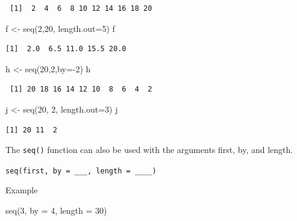 \documentclass[
  letterpaper,
  DIV=11,
  numbers=noendperiod]{scrreprt}
\newenvironment{Shaded}{\begin{snugshade}}{\end{snugshade}}
\newcommand{\AttributeTok}[1]{\textcolor[rgb]{0.40,0.45,0.13}{#1}}
\newcommand{\DecValTok}[1]{\textcolor[rgb]{0.68,0.00,0.00}{#1}}
\newcommand{\FunctionTok}[1]{\textcolor[rgb]{0.28,0.35,0.67}{#1}}
\newcommand{\NormalTok}[1]{\textcolor[rgb]{0.00,0.23,0.31}{#1}}
\newcommand{\OtherTok}[1]{\textcolor[rgb]{0.00,0.23,0.31}{#1}}
\newcommand{\SpecialCharTok}[1]{\textcolor[rgb]{0.37,0.37,0.37}{#1}}
\begin{document}
\begin{verbatim}
 [1]  2  4  6  8 10 12 14 16 18 20
\end{verbatim}

\begin{Shaded}
\begin{Highlighting}[]
\NormalTok{f }\OtherTok{\textless{}{-}} \FunctionTok{seq}\NormalTok{(}\DecValTok{2}\NormalTok{,}\DecValTok{20}\NormalTok{, }\AttributeTok{length.out=}\DecValTok{5}\NormalTok{)}
\NormalTok{f}
\end{Highlighting}
\end{Shaded}

\begin{verbatim}
[1]  2.0  6.5 11.0 15.5 20.0
\end{verbatim}

\begin{Shaded}
\begin{Highlighting}[]
\NormalTok{h }\OtherTok{\textless{}{-}} \FunctionTok{seq}\NormalTok{(}\DecValTok{20}\NormalTok{,}\DecValTok{2}\NormalTok{,}\AttributeTok{by=}\SpecialCharTok{{-}}\DecValTok{2}\NormalTok{)}
\NormalTok{h}
\end{Highlighting}
\end{Shaded}

\begin{verbatim}
 [1] 20 18 16 14 12 10  8  6  4  2
\end{verbatim}

\begin{Shaded}
\begin{Highlighting}[]
\NormalTok{j }\OtherTok{\textless{}{-}} \FunctionTok{seq}\NormalTok{(}\DecValTok{20}\NormalTok{, }\DecValTok{2}\NormalTok{, }\AttributeTok{length.out=}\DecValTok{3}\NormalTok{)}
\NormalTok{j}
\end{Highlighting}
\end{Shaded}

\begin{verbatim}
[1] 20 11  2
\end{verbatim}

The \texttt{seq()} function can also be used with the arguments first,
by, and length.

\texttt{seq(first,\ by\ =\ \_\_\_,\ length\ =\ \_\_\_\_)}

Example

\begin{Shaded}
\begin{Highlighting}[]
\FunctionTok{seq}\NormalTok{(}\DecValTok{3}\NormalTok{, }\AttributeTok{by =} \DecValTok{4}\NormalTok{, }\AttributeTok{length =} \DecValTok{30}\NormalTok{)}
\end{Highlighting}
\end{Shaded}
\end{document}
